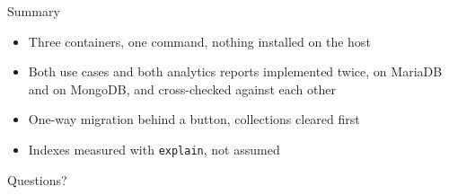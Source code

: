 \documentclass[aspectratio=169, 11pt]{beamer}
\begin{document}
\begin{frame}{Summary}
  \begin{itemize}
    \item Three containers, one command, nothing installed on the host
    \item Both use cases and both analytics reports implemented twice, on
          MariaDB and on MongoDB, and cross-checked against each other
    \item One-way migration behind a button, collections cleared first
    \item Indexes measured with \texttt{explain}, not assumed
  \end{itemize}
  \vfill
  \begin{center}\Large\color{darkblue}Questions?\end{center}
\end{frame}
\end{document}
